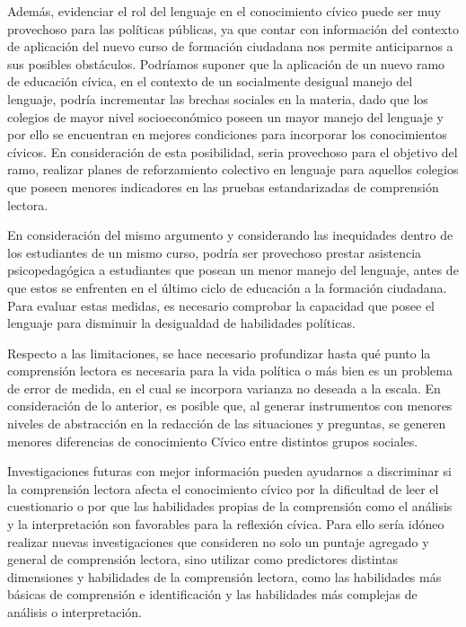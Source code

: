 \documentclass[12pt,twoside]{templates/facsothesis}
\begin{document}
Además, evidenciar el rol del lenguaje en el conocimiento cívico puede ser muy provechoso para las políticas públicas, ya que contar con información del contexto de aplicación del nuevo curso de formación ciudadana nos permite anticiparnos a sus posibles obstáculos. Podríamos suponer que la aplicación de un nuevo ramo de educación cívica, en el contexto de un socialmente desigual manejo del lenguaje, podría incrementar las brechas sociales en la materia, dado que los colegios de mayor nivel socioeconómico poseen un mayor manejo del lenguaje y por ello se encuentran en mejores condiciones para incorporar los conocimientos cívicos. En consideración de esta posibilidad, seria provechoso para el objetivo del ramo, realizar planes de reforzamiento colectivo en lenguaje para aquellos colegios que poseen menores indicadores en las pruebas estandarizadas de comprensión lectora.

En consideración del mismo argumento y considerando las inequidades dentro de los estudiantes de un mismo curso, podría ser provechoso prestar asistencia psicopedagógica a estudiantes que posean un menor manejo del lenguaje, antes de que estos se enfrenten en el último ciclo de educación a la formación ciudadana. Para evaluar estas medidas, es necesario comprobar la capacidad que posee el lenguaje para disminuir la desigualdad de habilidades políticas.

Respecto a las limitaciones, se hace necesario profundizar hasta qué punto la comprensión lectora es necesaria para la vida política o más bien es un problema de error de medida, en el cual se incorpora varianza no deseada a la escala. En consideración de lo anterior, es posible que, al generar instrumentos con menores niveles de abstracción en la redacción de las situaciones y preguntas, se generen menores diferencias de conocimiento Cívico entre distintos grupos sociales.

Investigaciones futuras con mejor información pueden ayudarnos a discriminar si la comprensión lectora afecta el conocimiento cívico por la dificultad de leer el cuestionario o por que las habilidades propias de la comprensión como el análisis y la interpretación son favorables para la reflexión cívica. Para ello sería idóneo realizar nuevas investigaciones que consideren no solo un puntaje agregado y general de comprensión lectora, sino utilizar como predictores distintas dimensiones y habilidades de la comprensión lectora, como las habilidades más básicas de comprensión e identificación y las habilidades más complejas de análisis o interpretación.
\end{document}
